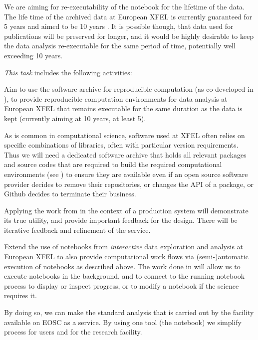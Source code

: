 \begin{task}[
  title=Reproducible X-ray crystallography workflows at European XFEL,
  id=reproducibility-xfel,
  lead=XFEL,
  PM=36,
  wphases={6-48},
  partners={XFEL}
  ]
  We are aiming for re-executability of the notebook for the lifetime
  of the data. The life time of the archived data at European XFEL is
  currently guaranteed for 5 years and aimed to be 10 years
  \cite{EuXFEL-datapolicy-2017}. It is possible though, that data used
  for publications will be preserved for longer, and it would be
  highly desirable to keep the data analysis re-executable for the
  same period of time, potentially well exceeding 10 years.

  \medskip \emph{This task} includes the following activities:
  \begin{compactitem}
  \item Aim to use the software archive for reproducible computation
    (as co-developed in ), to
    provide reproducible computation environments for data analysis at
    European XFEL that remains executable for the same duration as the
    data is kept (currently aiming at 10 years, at least 5).

    As is common in computational science, software used at XFEL often
    relies on specific combinations of libraries, often with
    particular version requirements. Thus we will need a dedicated
    software archive that holds all relevant packages and source codes
    that are required to build the required computational environments
    (see ) to ensure they are
    available even if an open source software provider decides to
    remove their repositories, or changes the API of a package, or
    Github decides to terminate their business.

    Applying the work from  in the
    context of a production system will demonstrate its true utility,
    and provide important feedback for the design. There will be
    iterative feedback and refinement of the service.

  \item Extend the use of notebooks from \emph{interactive} data
    exploration and analysis at European XFEL to also provide
    computational work flows via (semi-)automatic execution of
    notebooks as described above. The work done in
     will allow us to execute notebooks in
    the background, and to connect to the running notebook process to
    display or inspect progress, or to modify a notebook if the
    science requires it.

    By doing so, we can make the standard analysis that is carried out
    by the facility available on EOSC as a service. By using one tool
    (the notebook) we simplify process for users and for the research
    facility.


\end{compactitem}
\end{task}
